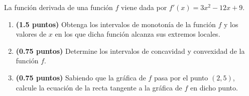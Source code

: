 
La función derivada de una función $f$ viene dada por $f'(x)=3x^2-12x+9$.
\begin{enumerate}[label=\alph*)]
\item \textbf{(1.5 puntos)} Obtenga los intervalos de monotonía de la función $f$ y los valores de $x$ en los que dicha función alcanza sus extremos locales.
\item \textbf{(0.75 puntos)} Determine los intervalos de concavidad y convexidad de la función $f$.
\item \textbf{(0.75 puntos)} Sabiendo que la gráfica de $f$ pasa por el punto $(2,5)$, calcule la ecuación de la recta tangente a la gráfica de $f$ en dicho punto.
\end{enumerate}
